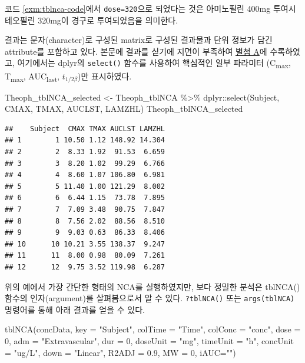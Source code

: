 \documentclass[
  11pt,
  krantz2, a4paper, twoside]{krantz}
\newenvironment{Shaded}{\begin{snugshade}}{\end{snugshade}}
\newcommand{\AttributeTok}[1]{\textcolor[rgb]{0.77,0.63,0.00}{#1}}
\newcommand{\DecValTok}[1]{\textcolor[rgb]{0.00,0.00,0.81}{#1}}
\newcommand{\FloatTok}[1]{\textcolor[rgb]{0.00,0.00,0.81}{#1}}
\newcommand{\FunctionTok}[1]{\textcolor[rgb]{0.00,0.00,0.00}{#1}}
\newcommand{\NormalTok}[1]{#1}
\newcommand{\OtherTok}[1]{\textcolor[rgb]{0.56,0.35,0.01}{#1}}
\newcommand{\SpecialCharTok}[1]{\textcolor[rgb]{0.00,0.00,0.00}{#1}}
\newcommand{\StringTok}[1]{\textcolor[rgb]{0.31,0.60,0.02}{#1}}
\theoremstyle{definition}
\theoremstyle{definition}
\theoremstyle{definition}
\theoremstyle{definition}
\theoremstyle{remark}
\begin{document}
코드 \ref{exm:tblnca-code}에서 \texttt{dose=320}으로 되었다는 것은 아미노필린 400mg 투여시 테오필린 320mg이 경구로 투여되었음을 의미한다.

결과는 문자(character)로 구성된 matrix로 구성된 결과물과 단위 정보가 담긴 attribute를 포함하고 있다.
본문에 결과를 싣기에 지면이 부족하여 \protect\hyperlink{Theoph_tblNCA}{별첨 A}에 수록하였고, 여기에서는 dplyr의 \texttt{select()} 함수를 사용하여 핵심적인 일부 파라미터 (C\textsubscript{max}, T\textsubscript{max}, AUC\textsubscript{last}, \(t_{1/2\beta}\))만 표시하였다.

\begin{Shaded}
\begin{Highlighting}[]
\NormalTok{Theoph\_tblNCA\_selected }\OtherTok{\textless{}{-}}\NormalTok{ Theoph\_tblNCA }\SpecialCharTok{\%\textgreater{}\%} 
\NormalTok{  dplyr}\SpecialCharTok{::}\FunctionTok{select}\NormalTok{(Subject, CMAX, TMAX, AUCLST, LAMZHL)}
\NormalTok{Theoph\_tblNCA\_selected}
\end{Highlighting}
\end{Shaded}

\begin{verbatim}
##    Subject  CMAX TMAX AUCLST LAMZHL
## 1        1 10.50 1.12 148.92 14.304
## 2        2  8.33 1.92  91.53  6.659
## 3        3  8.20 1.02  99.29  6.766
## 4        4  8.60 1.07 106.80  6.981
## 5        5 11.40 1.00 121.29  8.002
## 6        6  6.44 1.15  73.78  7.895
## 7        7  7.09 3.48  90.75  7.847
## 8        8  7.56 2.02  88.56  8.510
## 9        9  9.03 0.63  86.33  8.406
## 10      10 10.21 3.55 138.37  9.247
## 11      11  8.00 0.98  80.09  7.261
## 12      12  9.75 3.52 119.98  6.287
\end{verbatim}

위의 예에서 가장 간단한 형태의 NCA를 실행하였지만, 보다 정밀한 분석은 tblNCA() 함수의 인자(argument)를 살펴봄으로서 알 수 있다. \texttt{?tblNCA()} 또는 \texttt{args(tblNCA)} 명령어를 통해 아래 결과를 얻을 수 있다.

\begin{Shaded}
\begin{Highlighting}[]
\FunctionTok{tblNCA}\NormalTok{(concData, }\AttributeTok{key =} \StringTok{"Subject"}\NormalTok{, }\AttributeTok{colTime =} \StringTok{"Time"}\NormalTok{, }\AttributeTok{colConc =} \StringTok{"conc"}\NormalTok{, }
       \AttributeTok{dose =} \DecValTok{0}\NormalTok{, }\AttributeTok{adm =} \StringTok{"Extravascular"}\NormalTok{, }\AttributeTok{dur =} \DecValTok{0}\NormalTok{, }\AttributeTok{doseUnit =} \StringTok{"mg"}\NormalTok{, }
       \AttributeTok{timeUnit =} \StringTok{"h"}\NormalTok{, }\AttributeTok{concUnit =} \StringTok{"ug/L"}\NormalTok{, }\AttributeTok{down =} \StringTok{"Linear"}\NormalTok{, }\AttributeTok{R2ADJ =} \FloatTok{0.9}\NormalTok{, }
       \AttributeTok{MW =} \DecValTok{0}\NormalTok{, }\AttributeTok{iAUC=}\StringTok{""}\NormalTok{)}
\end{Highlighting}
\end{Shaded}
\end{document}
